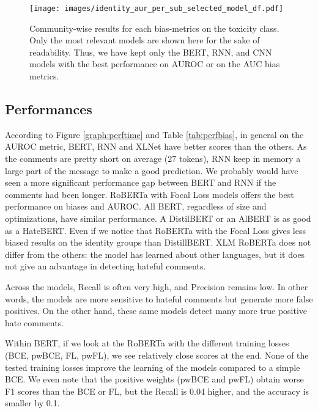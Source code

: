 \documentclass[a4paper,english]{rnti}
\begin{document}
\begin{figure}[ht]
  \centering
  \texttt{[image: images/identity\_aur\_per\_sub\_selected\_model\_df.pdf]}
  \caption{Community-wise results for each bias-metrics on the toxicity class. Only the most relevant models are shown here for the sake of readability. Thus, we have kept only the BERT, RNN, and CNN models with the best performance on AUROC or on the AUC bias metrics.}
  \label{graph:perfidentity}
\end{figure}

























\subsection{Performances}

According to Figure \ref{graph:perftime} and Table \ref{tab:perfbias}, in general on the AUROC metric, BERT, RNN and XLNet have better scores than the others. As the comments are pretty short on average (27 tokens), RNN keep in memory a large part of the message to make a good prediction. We probably would have seen a more significant performance gap between BERT and RNN if the comments had been longer. RoBERTa with Focal Loss models offers the best performance on biases and AUROC. All BERT, regardless of size and optimizations, have similar performance. A DistilBERT or an AlBERT is as good as a HateBERT. Even if we notice that RoBERTa with the Focal Loss gives less biased results on the identity groups than DistillBERT. XLM RoBERTa does not differ from the others: the model has learned about other languages, but it does not give an advantage in detecting hateful comments.

Across the models, Recall is often very high, and Precision remains low. In other words, the models are more sensitive to hateful comments but generate more false positives. On the other hand, these same models detect many more true positive hate comments.

Within BERT, if we look at the RoBERTa with the different training losses (BCE, pwBCE, FL, pwFL), we see relatively close scores at the end. None of the tested training losses improve the learning of the models compared to a simple BCE.
We even note that the positive weights (pwBCE and pwFL) obtain worse F1 scores than the BCE or FL, but the Recall is 0.04 higher, and the accuracy is smaller by 0.1.
\end{document}
